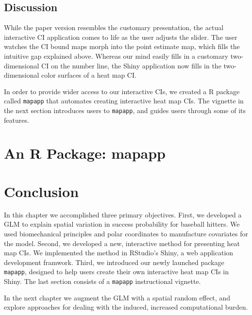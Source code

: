 \subsection{Discussion}

While the paper version resembles the customary presentation, the actual interactive CI application comes to life as the user adjusts the slider. The user watches the CI bound maps morph into the point estimate map, which fills the intuitive gap explained above. Whereas our mind easily fills in a customary two-dimensional CI on the number line, the Shiny application now fills in the two-dimensional color surfaces of a heat map CI.

In order to provide wider access to our interactive CIs, we created a R package called \verb|mapapp| that automates creating interactive heat map CIs. The vignette in the next section introduces users to \verb|mapapp|, and guides users through some of its features. 

\section{ An R Package: mapapp}

\section{Conclusion}

In this chapter we accomplished three primary objectives. First, we developed a GLM to explain spatial variation in success probability for baseball hitters. We used biomechanical principles and polar coordinates to manufacture covariates for the model. Second, we developed a new, interactive method for presenting heat map CIs. We implemented the method in RStudio's Shiny, a web application development framwork. Third, we introduced our newly launched package \verb|mapapp|, designed to help users create their own interactive heat map CIs in Shiny. The last section consists of a \verb|mapapp| instructional vignette.

In the next chapter we augment the GLM with a spatial random effect, and explore approaches for dealing with the induced, increased computational burden.


